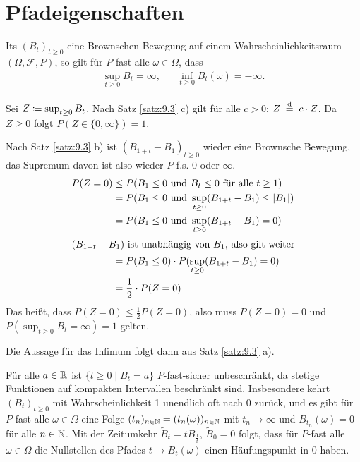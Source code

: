 \documentclass[a4paper,twoside,DIV15,BCOR12mm]{scrbook}
\newcommand{\cF}{\mathcal F}
\begin{document}
\section{Pfadeigenschaften}

\begin{satz}
\label{satz:11.1}
Its $(B_t)_{t\ge 0}$ eine Brownschen Bewegung auf einem Wahrscheinlichkeitsraum $(\Omega, \cF, P)$, so gilt für $P$-fast-alle $\omega\in \Omega$, dass 
\begin{align*}
\sup_{t\ge 0} B_t = \infty, &&\inf_{t\ge 0}B_t(\omega)=-\infty.
\end{align*}
\end{satz}
\begin{beweis}
Sei $Z\da \sup_{t\ge 0}B_t$. Nach Satz \ref{satz:9.3} c) gilt für alle $c>0$:
$Z\gleichnach{d} c\cdot Z$. Da $Z\ge 0$ folgt $P(Z \in \{0,\infty\})=1$.

Nach Satz \ref{satz:9.3} b) ist $(B_{1+t}-B_1)_{t\ge 0}$ wieder eine Brownsche Bewegung, das Supremum davon ist also wieder $P$-f.s. $0$ oder $\infty$.
\begin{align*}
P(Z=0) &\le P(B_1\le 0\text{ und }B_t\le 0\text{ für alle } t\ge 1) \\
&=P(B_1\le 0 \text{ und } \sup_{t\ge 0}(B_{1+t}-B_1) \le |B_1|) \\
&= P(B_1 \le 0 \text{ und } \sup_{t\ge 0}(B_{1+t}-B_1) = 0) \\
\intertext{$(B_{1+t}-B_1)$ ist unabhängig von $B_1$, also gilt weiter}
&= P(B_1\le 0)\cdot P(\sup_{t\ge 0}(B_{1+t}-B_1) = 0) \\
&= \frac12 \cdot P(Z=0)
\end{align*}
Das heißt, dass $P(Z=0)\le \frac 12 P(Z=0)$, also muss $P(Z=0)=0$ und $P(\sup_{t\ge 0}B_t =\infty) = 1$ gelten.

Die Aussage für das Infimum folgt dann aus Satz \ref{satz:9.3} a).
\end{beweis}


\begin{bemerkung}
Für alle $a\in \mathbb{R}$ ist $\{t\ge 0\mid B_t=a\}$ $P$-fast-sicher unbeschränkt, da stetige Funktionen auf kompakten Intervallen beschränkt sind. Insbesondere kehrt $(B_t)_{t\ge 0}$ mit Wahrscheinlichkeit 1 unendlich oft nach 0 zurück, und es gibt für $P$-fast-alle $\omega\in\Omega$ eine Folge $(t_n)_{n\in \mathbb{N}}  = (t_n(\omega))_{n\in\mathbb{N}}$ mit $t_n\to \infty$ und $B_{t_n}(\omega)=0$ für alle $n\in\mathbb{N}$. Mit der Zeitumkehr $\tilde B_t=tB_{\frac 1t}$, $\tilde B_0=0$ folgt, dass für $P$-fast alle $\omega\in \Omega$ die Nullstellen des Pfades $t\to B_t(\omega)$ einen Häufungspunkt in $0$ haben.
\end{bemerkung}
\end{document}

